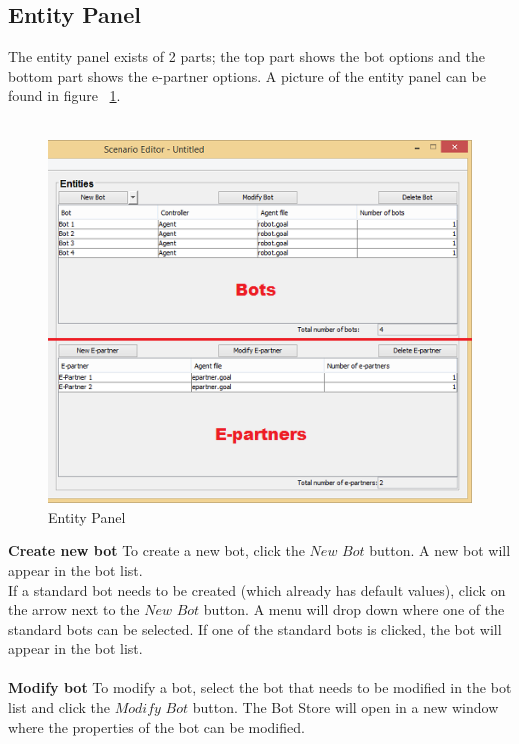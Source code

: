 \subsection{Entity Panel}
The entity panel exists of 2 parts; the top part shows the bot options and the bottom part shows the e-partner options. A picture of the entity panel can be found in figure ~\ref{fig:bot}.\\\\
\begin{figure}[h]
\begin{center}
\includegraphics{NewFeatures/bot.png}
\end{center}
\caption{Entity Panel}
\label{fig:bot}
\end{figure}
\textbf{Create new bot}
To create a new bot, click the $New$ $Bot$ button. A new bot will appear in the bot list.\\
If a standard bot needs to be created (which already has default values), click on the arrow next to the $New$ $Bot$ button. A menu will drop down where one of the standard bots can be selected. If one of the standard bots is clicked, the bot will appear in the bot list.
\\\\
\textbf{Modify bot}
To modify a bot, select the bot that needs to be modified in the bot list and click the $Modify$ $Bot$ button. The Bot Store will open in a new window where the properties of the bot can be modified.
\\\\
